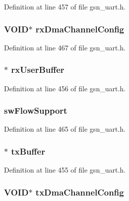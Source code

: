 Definition at line 457 of file gsn\_\-uart.h.

\hypertarget{a00263_a8c322936bd6cb1f93600dc207bb8fd0a}{
\subsubsection[{rxDmaChannelConfig}]{\setlength{\rightskip}{0pt plus 5cm}VOID$\ast$ {\bf rxDmaChannelConfig}}}
\label{a00263_a8c322936bd6cb1f93600dc207bb8fd0a}


Definition at line 467 of file gsn\_\-uart.h.

\hypertarget{a00263_ab193a10d1ff3641a6f7675c7f15b1fd5}{
\subsubsection[{rxUserBuffer}]{$\ast$ {\bf rxUserBuffer}}}
\label{a00263_ab193a10d1ff3641a6f7675c7f15b1fd5}


Definition at line 456 of file gsn\_\-uart.h.

\hypertarget{a00263_aeb73ed49d5b7594525fafe0f0ff0590f}{
\subsubsection[{swFlowSupport}]{ {\bf swFlowSupport}}}
\label{a00263_aeb73ed49d5b7594525fafe0f0ff0590f}


Definition at line 465 of file gsn\_\-uart.h.

\hypertarget{a00263_aaa16ff66d9982ada7aebae8e16dd1579}{
\subsubsection[{txBuffer}]{$\ast$ {\bf txBuffer}}}
\label{a00263_aaa16ff66d9982ada7aebae8e16dd1579}


Definition at line 455 of file gsn\_\-uart.h.

\hypertarget{a00263_a4c07197d124d1ed9e821f15b3b78a066}{
\subsubsection[{txDmaChannelConfig}]{\setlength{\rightskip}{0pt plus 5cm}VOID$\ast$ {\bf txDmaChannelConfig}}}
\label{a00263_a4c07197d124d1ed9e821f15b3b78a066}


